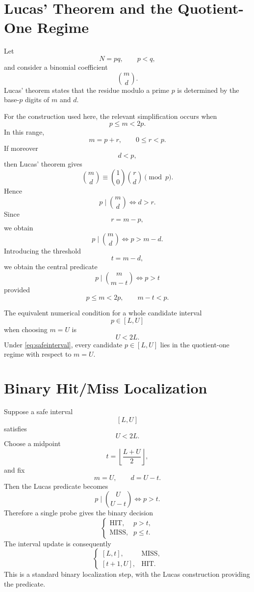 \documentclass[11pt,a4paper]{article}
\begin{document}
\section{Lucas' Theorem and the Quotient-One Regime}

Let
\[
N=pq,
\qquad p<q,
\]
and consider a binomial coefficient
\[
\binom{m}{d}.
\]
Lucas' theorem states that the residue modulo a prime $p$ is determined by the base-$p$ digits of $m$ and $d$.

For the construction used here, the relevant simplification occurs when
\[
p\le m<2p.
\]
In this range,
\[
m=p+r,
\qquad 0\le r<p.
\]
If moreover
\[
d<p,
\]
then Lucas' theorem gives
\[
\binom{m}{d}
\equiv
\binom{1}{0}\binom{r}{d}
\pmod p.
\]
Hence
\[
p\mid\binom{m}{d}
\iff
d>r.
\]
Since
\[
r=m-p,
\]
we obtain
\[
p\mid\binom{m}{d}
\iff
p>m-d.
\]
Introducing the threshold
\[
t=m-d,
\]
we obtain the central predicate
\begin{equation}
\boxed{
 p\mid\binom{m}{m-t}
 \iff p>t
}
\label{eq:threshold}
\end{equation}
provided
\[
p\le m<2p,
\qquad
m-t<p.
\]

The equivalent numerical condition for a whole candidate interval
\[
p\in[L,U]
\]
when choosing $m=U$ is
\begin{equation}
U<2L.
\label{eq:safeinterval}
\end{equation}
Under \eqref{eq:safeinterval}, every candidate $p\in[L,U]$ lies in the quotient-one regime with respect to $m=U$.

\section{Binary Hit/Miss Localization}

Suppose a safe interval
\[
[L,U]
\]
satisfies
\[
U<2L.
\]
Choose a midpoint
\[
t=\left\lfloor\frac{L+U}{2}\right\rfloor,
\]
and fix
\[
m=U,
\qquad
 d=U-t.
\]
Then the Lucas predicate becomes
\[
p\mid\binom{U}{U-t}
\iff p>t.
\]
Therefore a single probe gives the binary decision
\[
\begin{cases}
\text{HIT}, & p>t,\\
\text{MISS}, & p\le t.
\end{cases}
\]
The interval update is consequently
\[
\begin{cases}
[L,t], & \text{MISS},\\
[t+1,U], & \text{HIT}.
\end{cases}
\]
This is a standard binary localization step, with the Lucas construction providing the predicate.
\end{document}
